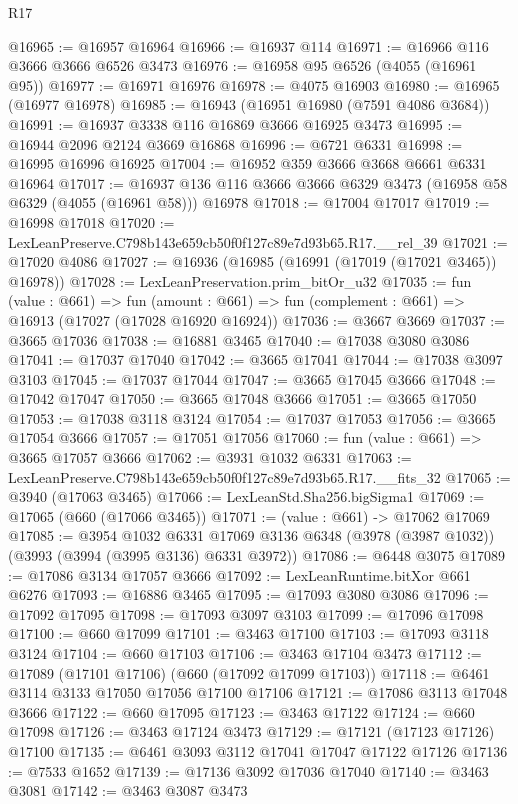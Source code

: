 \begin{lexlean}{R17}
\begin{coremodule}
@16965 := @16957 @16964
@16966 := @16937 @114
@16971 := @16966 @116 @3666 @3666 @6526 @3473
@16976 := @16958 @95 @6526 (@4055 (@16961 @95))
@16977 := @16971 @16976
@16978 := @4075 @16903
@16980 := @16965 (@16977 @16978)
@16985 := @16943 (@16951 @16980 (@7591 @4086 @3684))
@16991 := @16937 @3338 @116 @16869 @3666 @16925 @3473
@16995 := @16944 @2096 @2124 @3669 @16868
@16996 := @6721 @6331
@16998 := @16995 @16996 @16925
@17004 := @16952 @359 @3666 @3668 @6661 @6331 @16964
@17017 := @16937 @136 @116 @3666 @3666 @6329 @3473 (@16958 @58 @6329 (@4055 (@16961 @58))) @16978
@17018 := @17004 @17017
@17019 := @16998 @17018
@17020 := LexLeanPreserve.C798b143e659cb50f0f127c89e7d93b65.R17.__rel_39
@17021 := @17020 @4086
@17027 := @16936 (@16985 (@16991 (@17019 (@17021 @3465)) @16978))
@17028 := LexLeanPreservation.prim_bitOr_u32
@17035 := fun (value : @661) =>
  fun (amount : @661) => fun (complement : @661) => @16913 (@17027 (@17028 @16920 @16924))
@17036 := @3667 @3669
@17037 := @3665 @17036
@17038 := @16881 @3465
@17040 := @17038 @3080 @3086
@17041 := @17037 @17040
@17042 := @3665 @17041
@17044 := @17038 @3097 @3103
@17045 := @17037 @17044
@17047 := @3665 @17045 @3666
@17048 := @17042 @17047
@17050 := @3665 @17048 @3666
@17051 := @3665 @17050
@17053 := @17038 @3118 @3124
@17054 := @17037 @17053
@17056 := @3665 @17054 @3666
@17057 := @17051 @17056
@17060 := fun (value : @661) => @3665 @17057 @3666
@17062 := @3931 @1032 @6331
@17063 := LexLeanPreserve.C798b143e659cb50f0f127c89e7d93b65.R17.__fits_32
@17065 := @3940 (@17063 @3465)
@17066 := LexLeanStd.Sha256.bigSigma1
@17069 := @17065 (@660 (@17066 @3465))
@17071 := (value : @661) -> @17062 @17069
@17085 := @3954
    @1032
    @6331
    @17069
    @3136
    @6348
    (@3978 (@3987 @1032))
    (@3993 (@3994 (@3995 @3136) @6331 @3972))
@17086 := @6448 @3075
@17089 := @17086 @3134 @17057 @3666
@17092 := LexLeanRuntime.bitXor @661 @6276
@17093 := @16886 @3465
@17095 := @17093 @3080 @3086
@17096 := @17092 @17095
@17098 := @17093 @3097 @3103
@17099 := @17096 @17098
@17100 := @660 @17099
@17101 := @3463 @17100
@17103 := @17093 @3118 @3124
@17104 := @660 @17103
@17106 := @3463 @17104 @3473
@17112 := @17089 (@17101 @17106) (@660 (@17092 @17099 @17103))
@17118 := @6461 @3114 @3133 @17050 @17056 @17100 @17106
@17121 := @17086 @3113 @17048 @3666
@17122 := @660 @17095
@17123 := @3463 @17122
@17124 := @660 @17098
@17126 := @3463 @17124 @3473
@17129 := @17121 (@17123 @17126) @17100
@17135 := @6461 @3093 @3112 @17041 @17047 @17122 @17126
@17136 := @7533 @1652
@17139 := @17136 @3092 @17036 @17040
@17140 := @3463 @3081
@17142 := @3463 @3087 @3473

\end{coremodule}
\end{lexlean}
